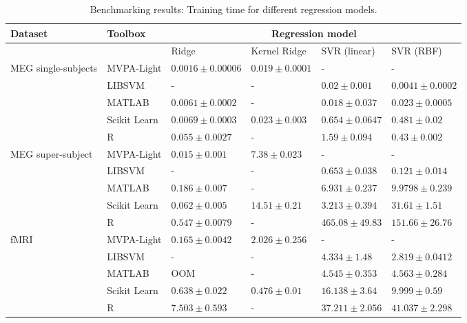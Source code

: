 \documentclass[utf8]{frontiersSCNS} %
\begin{document}
\begin{table}
\footnotesize
\begin{tabular}{ |p{1.1cm}|p{1.8cm}|p{2cm}|p{2cm}|p{2cm}|p{2cm}|}
 \hline
 Dataset & Toolbox  & \multicolumn{4}{c|}{Regression model}\\ \hline
\multicolumn{2}{|c|}{}  & Ridge & Kernel Ridge & SVR (linear) & SVR (RBF)\\
 \hline
\multirow{4}{1.3cm}{MEG single-subjects} & MVPA-Light  & $\mathbf{0.0016}\pm0.00006$ & $\mathbf{0.019}\pm0.0001$ & - & -\\
\cline{2-6}
  & LIBSVM & - &  - & $0.02\pm0.001$ & $\mathbf{0.0041}\pm0.0002$ \\
\cline{2-6}
  & MATLAB & $0.0061\pm0.0002$ & - & $\mathbf{0.018}\pm0.037$ & $0.023\pm0.0005$\\   %
\cline{2-6}
  & Scikit Learn & $0.0069\pm0.0003$ & $0.023\pm0.003$ & $0.654\pm0.0647$ & $0.481\pm0.02$\\
\cline{2-6}
  & R & $0.055\pm0.0027$ & - & $1.59\pm0.094$ & $0.43\pm0.002$ \\\hline
 \hline
 \multirow{4}{1.3cm}{MEG super-subject} & MVPA-Light & $\mathbf{0.015}\pm0.001$ & $\mathbf{7.38}\pm0.023$ & - & -\\
\cline{2-6}
  & LIBSVM & - &  - & $\mathbf{0.653}\pm0.038$ & $\mathbf{0.121}\pm0.014$ \\
\cline{2-6}
  & MATLAB & $0.186\pm0.007$ & - & $6.931\pm0.237$ & $9.9798\pm0.239$\\
\cline{2-6}
  & Scikit Learn & $0.062\pm0.005$ & $14.51\pm0.21$ & $3.213\pm0.394$ & $31.61\pm1.51$\\
\cline{2-6}
  & R & $0.547\pm0.0079$ & - & $465.08\pm49.83$ & $151.66\pm26.76$\\\hline
  \hline
\multirow{4}{1.3cm}{fMRI} & MVPA-Light & $\mathbf{0.165}\pm0.0042$ & $2.026\pm0.256$ & - & -\\
\cline{2-6}
  & LIBSVM & - &  - & $\mathbf{4.334}\pm1.48$ & $\mathbf{2.819}\pm0.0412$ \\
\cline{2-6}
  & MATLAB & OOM & - & $4.545\pm0.353$  & $4.563\pm0.284$\\
\cline{2-6}
  & Scikit Learn & $0.638\pm0.022$ & $\mathbf{0.476}\pm0.01$ & $16.138\pm3.64$ & $9.999\pm0.59$\\
\cline{2-6}
  & R & $7.503\pm0.593$ & - & $37.211\pm2.056$ & $41.037\pm2.298$\\\hline
\end{tabular}
\caption{Benchmarking results: Training time for different regression models.}
\label{tab:regression}
\end{table}
\end{document}
